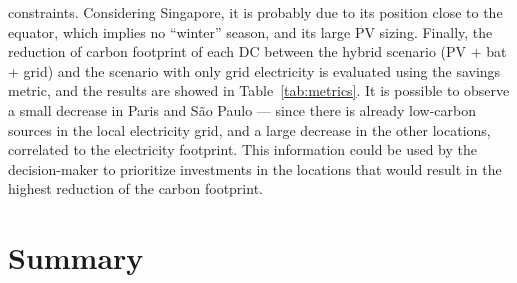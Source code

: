 constraints. Considering Singapore, it is probably due to its position close to the equator, which implies no ``winter'' season, and its large PV sizing. Finally, the reduction of carbon footprint of each DC between the hybrid scenario (PV + bat + grid) and the scenario with only grid electricity is evaluated using the  savings metric, and the results are showed in Table~\ref{tab:metrics}. It is possible to observe a small decrease in Paris and S\~ao Paulo --- since there is already low-carbon sources in the local electricity grid, and a large decrease in the other locations, correlated to the electricity footprint. This information could be used by the decision-maker to prioritize investments in the locations that would result in the highest reduction of the carbon footprint.


\section{Summary}
\label{sec:conclusion_ccgrid}


